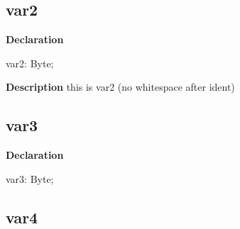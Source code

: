 \documentclass{report}
\newif\ifpdf
\begin{document}
\subsection*{var2}
\fi
\label{ok_auto_back_comments-var2}
\begin{list}{}{
\setlength{\itemindent}{0cm}
\setlength{\listparindent}{0cm}
\setlength{\leftmargin}{\evensidemargin}
\addtolength{\leftmargin}{\tmplength}
\settowidth{\labelsep}{X}
\addtolength{\leftmargin}{\labelsep}
\setlength{\labelwidth}{\tmplength}
}
\item[\textbf{Declaration}\hfill]
\ifpdf
\begin{flushleft}
\fi
\begin{ttfamily}
var2: Byte;\end{ttfamily}

\ifpdf
\end{flushleft}
\fi

\par
\item[\textbf{Description}]
this is var2 (no whitespace after ident)

\end{list}
\ifpdf
\subsection*{\large{\textbf{var3}}\normalsize\hspace{1ex}\hrulefill}
\else
\subsection*{var3}
\fi
\label{ok_auto_back_comments-var3}
\begin{list}{}{
\setlength{\itemindent}{0cm}
\setlength{\listparindent}{0cm}
\setlength{\leftmargin}{\evensidemargin}
\addtolength{\leftmargin}{\tmplength}
\settowidth{\labelsep}{X}
\addtolength{\leftmargin}{\labelsep}
\setlength{\labelwidth}{\tmplength}
}
\item[\textbf{Declaration}\hfill]
\ifpdf
\begin{flushleft}
\fi
\begin{ttfamily}
var3: Byte;\end{ttfamily}

\ifpdf
\end{flushleft}
\fi

\end{list}
\ifpdf
\subsection*{\large{\textbf{var4}}\normalsize\hspace{1ex}\hrulefill}
\else
\end{document}
